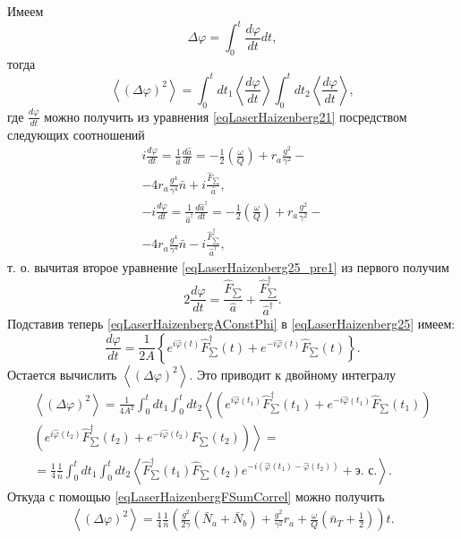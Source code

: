 Имеем
\[
\Delta \varphi = \int_0^t \frac{d \varphi}{d t}dt,
\]
тогда
\[
\left<\left(\Delta \varphi\right)^2\right> = \int_0^t d t_1 \left<\frac{d \varphi}{d t}\right>
\int_0^{t} d t_2 \left<\frac{d \varphi}{d t}\right>,
\]
где $\frac{d \varphi}{d t}$ можно получить из уравнения
\eqref{eqLaserHaizenberg21} посредством следующих соотношений
\begin{eqnarray}
i \frac{d \varphi}{d t} = \frac{1}{\hat{a}}\frac{d
  \hat{a}}{d t} = 
-\frac{1}{2}\left(\frac{\omega}{Q}\right)
+ r_a \frac{g^2}{\gamma^2} - 
\nonumber \\
- 4 r_a\frac{g^4}{\gamma^4} \bar{n} + i \frac{\hat{F}_{\sum}}{\hat{a}},
\nonumber \\
- i \frac{d \varphi}{d t} = \frac{1}{\hat{a}^{\dag}}\frac{d
  \hat{a}^{\dag}}{d t} = 
-\frac{1}{2}\left(\frac{\omega}{Q}\right)
+ r_a \frac{g^2}{\gamma^2} - 
\nonumber \\
- 4 r_a\frac{g^4}{\gamma^4} \bar{n} - i \frac{\hat{F}^{\dag}_{\sum}}{\hat{a}^{\dag}},
\label{eqLaserHaizenberg25_pre1}
\end{eqnarray}
т. о. вычитая второе уравнение \eqref{eqLaserHaizenberg25_pre1} из
первого получим
\begin{equation}
2 \frac{d \varphi}{d t} = 
\frac{\hat{F}_{\sum}}{\hat{a}} + \frac{\hat{F}^{\dag}_{\sum}}{\hat{a}^{\dag}}.
\label{eqLaserHaizenberg25}
\end{equation}
Подставив теперь \eqref{eqLaserHaizenbergAConstPhi} в
\eqref{eqLaserHaizenberg25} 
имеем:
\begin{equation}
\frac{d \varphi}{d t} = \frac{1}{2 A}
\left\{
e^{i\hat{\varphi}\left(t\right)}\hat{F}^{\dag}_{\sum}\left(t\right) +
e^{- i\hat{\varphi}\left(t\right)}\hat{F}_{\sum}\left(t\right)
\right\}.
\nonumber
\end{equation}
Остается вычислить  
\(
\left<\left(\Delta \varphi\right)^2\right>.
\)
Это приводит к двойному интегралу
\begin{eqnarray}
\left<\left(\Delta \varphi\right)^2\right> = 
\frac{1}{4 A^2}
\int_0^t d t_1 
\int_0^t d t_2
\left<
\left(
e^{i\hat{\varphi}\left(t_1\right)}\hat{F}^{\dag}_{\sum}\left(t_1\right) + 
e^{- i\hat{\varphi}\left(t_1\right)}\hat{F}_{\sum}\left(t_1\right)
\right)\right.
\nonumber \\
\left.
\left(
e^{i\hat{\varphi}\left(t_2\right)}\hat{F}^{\dag}_{\sum}\left(t_2\right) +
e^{- i\hat{\varphi}\left(t_2\right)}\hat{F}_{\sum}\left(t_2\right)
\right)
\right> = 
\nonumber \\
=
\frac{1}{4}\frac{1}{\bar{n}}
\int_0^t d t_1 
\int_0^t d t_2
\left<
\hat{F}^{\dag}_{\sum}\left(t_1\right)\hat{F}_{\sum}\left(t_2\right)e^{-i\left(
\hat{\varphi}\left(t_1\right) - \hat{\varphi}\left(t_2\right)
\right)} + \mbox{э. с.}\right>.
\nonumber
\end{eqnarray}
Откуда с помощью \eqref{eqLaserHaizenbergFSumCorrel} можно получить
\begin{eqnarray}
\left<\left(\Delta \varphi\right)^2\right> = 
\frac{1}{4}\frac{1}{\bar{n}}
\left(
\frac{g^2}{2\gamma}\left(\bar{N}_a + \bar{N}_b\right) + \frac{g^2}{\gamma^2}r_a + 
\frac{\omega}{Q}\left(\bar{n}_T + \frac{1}{2}\right)
\right) t.
\label{eqLaserHaizenbergTaskDelta}
\end{eqnarray}

